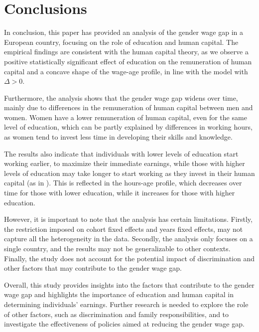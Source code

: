 \documentclass[12pt]{article}
\begin{document}
\section{Conclusions}
In conclusion, this paper has provided an analysis of the gender wage gap in a European country, focusing on the role of
education and human capital. The empirical findings are consistent with the human capital theory, as we observe a
positive statistically significant effect of education on the remuneration of human capital and a concave shape of the
wage-age profile, in line with the model with $\Delta > 0$.
\par
Furthermore, the analysis shows that the gender wage gap widens over time, mainly due to differences in the remuneration
of human capital between men and women. Women have a lower remuneration of human capital, even for the same level of
education, which can be partly explained by differences in working hours, as women tend to invest less time in
developing their skills and knowledge.
\par
The results also indicate that individuals with lower levels of education start working earlier, to maximize their immediate earnings, while those with higher levels of education may take longer to start working as
they invest in their human capital (as in \citet{yoram}). This is reflected in the hours-age profile, which decreases over time for those with
lower education, while it increases for those with higher education.
\par
However, it is important to note that the analysis has certain limitations. Firstly, the restriction imposed on cohort
fixed effects and years fixed effects, may not capture all the heterogeneity in the data. Secondly, the analysis
only focuses on a single country, and the results may not be generalizable to other contexts. Finally, the study does
not account for the potential impact of discrimination and other factors that may contribute to the gender wage gap.
\par
Overall, this study provides insights into the factors that contribute to the gender wage gap and highlights the
importance of education and human capital in determining individuals' earnings. Further research is needed to explore
the role of other factors, such as discrimination and family responsibilities, and to investigate the effectiveness of
policies aimed at reducing the gender wage gap.






\newpage
\medskip

\newpage
\end{document}
